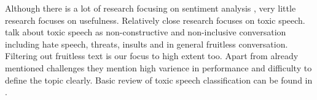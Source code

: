 Although there is a lot of research focusing on sentiment analysis ,
very little research focuses on usefulness.
Relatively close research focuses on toxic speech.
\citet{van2018challenges} talk about toxic speech as non-constructive and non-inclusive conversation including hate speech, threats, insults and in general fruitless conversation.
Filtering out fruitless text is our focus to high extent too.
Apart from already mentioned challenges they mention high varience in performance and difficulty to define the topic clearly.
Basic review of toxic speech classification can be found in \citet{gunasekara2018review}.
